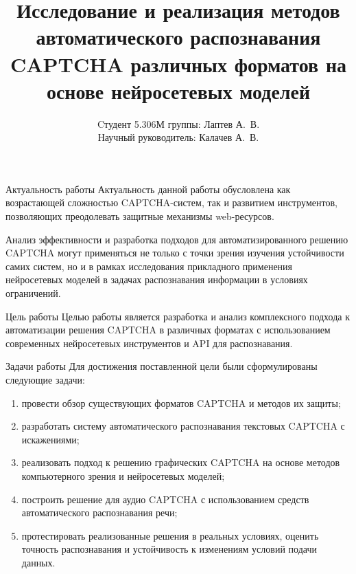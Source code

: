 \documentclass[12pt,a4paper,mathserif]{beamer}
\author[Лаптев А.В.]{{Cтудент 5.306М группы: Лаптев А.~В.}\\
{Научный руководитель: Калачев А.~В.}}
\title[Барнаул 2025]{\large Исследование и реализация методов автоматического распознавания CAPTCHA различных форматов на основе нейросетевых моделей}
\begin{document}
\begin{frame}
\maketitle
\end{frame}

\begin{frame}{Актуальность работы}
    \setlength{\parindent}{0.5cm}
    Актуальность данной работы обусловлена как возрастающей сложностью 
    CAPTCHA-систем, так и развитием инструментов, позволяющих преодолевать 
    защитные механизмы web-ресурсов.
    
    Анализ эффективности и разработка подходов для автоматизированного решению 
    CAPTCHA могут применяться не только с точки зрения изучения устойчивости 
    самих систем, но и в рамках исследования прикладного применения нейросетевых 
    моделей в задачах распознавания информации в условиях ограничений.
\end{frame}

\begin{frame}{Цель работы}
    \setlength{\parindent}{0.5cm}
    Целью работы является разработка и анализ комплексного подхода к 
    автоматизации решения CAPTCHA в различных форматах с использованием 
    современных нейросетевых инструментов и API для распознавания.
\end{frame}

\begin{frame}{Задачи работы}
    \setlength{\parindent}{0.5cm}
    Для достижения поставленной цели были сформулированы следующие задачи:

    \begin{enumerate}
        \item провести обзор существующих форматов CAPTCHA и методов их защиты;
        \item разработать систему автоматического распознавания текстовых CAPTCHA с 
        искажениями;
        \item реализовать подход к решению графических CAPTCHA на основе методов 
        компьютерного зрения и нейросетевых моделей;
        \item построить решение для аудио CAPTCHA с использованием средств 
        автоматического распознавания речи;
        \item протестировать реализованные решения в реальных условиях, оценить 
        точность распознавания и устойчивость к изменениям условий подачи данных.
    \end{enumerate}
\end{frame}
\end{document}
